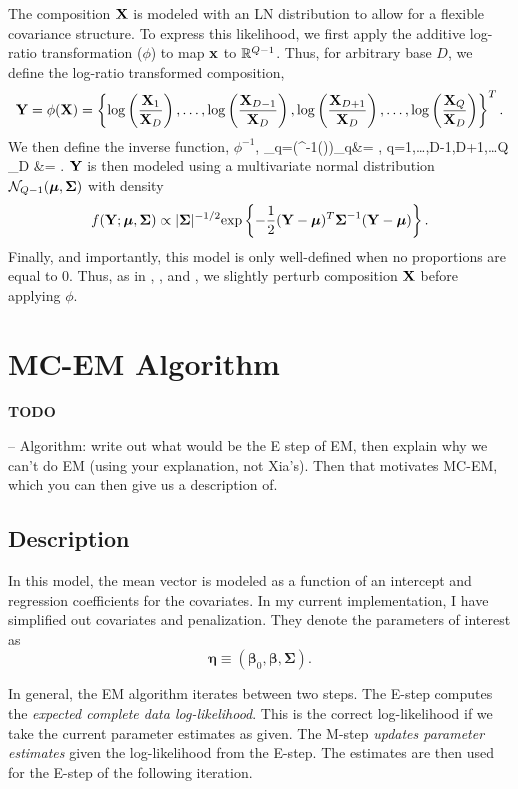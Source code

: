 \documentclass{template}
\begin{document}
The composition $\mathbf{X}$ is modeled with an LN distribution to allow for a flexible covariance structure. To express this likelihood, we first apply the additive log-ratio transformation ($\phi$) to map $\mathbf{x}$ to $\mathbb{R}^{Q-1}$. Thus, for arbitrary base $D$, we define the log-ratio transformed composition,
$$\mathbf{Y}=\phi(\mathbf{X})=\left\{\log\left(\dfrac{\mathbf{X}_1}{\mathbf{X}_D}\right),\ldots,\log\left(\dfrac{\mathbf{X}_{D-1}}{\mathbf{X}_D}\right),\log\left(\dfrac{\mathbf{X}_{D+1}}{\mathbf{X}_D}\right),\ldots,\log\left(\dfrac{\mathbf{X}_Q}{\mathbf{X}_D}\right)\right\}^T.$$
We then define the inverse function, $\phi^{-1}$,
\bal 
{}_q=(\phi^{-1}())_q&= , \quad q=1,\ldots,D-1,D+1,\ldots Q\\
_{D} &= .
\eal 
$\mathbf{Y}$ is then modeled using a multivariate normal distribution $\mathcal{N}_{Q-1}(\boldsymbol{\mu},\boldsymbol{\Sigma})$ with density
$$f(\mathbf{Y}; \boldsymbol{\mu},\boldsymbol{\Sigma}) \propto |\boldsymbol{\Sigma}|^{-1/2} \text{exp}\left\{-\dfrac{1}{2}(\mathbf{Y}-\boldsymbol{\mu})^T\boldsymbol{\Sigma}^{-1}(\mathbf{Y}-\boldsymbol{\mu})\right\}. $$
Finally, and importantly, this model is only well-defined when no proportions are equal to $0$. Thus, as in \cite{aitchison1986statistical}, \cite{billheimer2001statistical}, and \cite{xia2013logistic}, we slightly perturb composition $\mathbf{X}$ before applying $\phi$.


\section{MC-EM Algorithm}

\textbf{TODO}

-- Algorithm: write out what would be the E step of EM, then explain why we can't do EM (using your explanation, not Xia's). Then that motivates MC-EM, which you can then give us a description of.

\subsection{Description}

In this model, the mean vector is modeled as a function of an intercept and  regression coefficients for the covariates. In my current implementation, I have simplified out covariates and penalization. They denote the parameters of interest as $$\boldsymbol{\eta}\equiv (\boldsymbol{\beta}_0,\boldsymbol{\beta},\boldsymbol{\Sigma}).$$

In general, the EM algorithm iterates between two steps. The E-step computes the \textit{expected complete data log-likelihood}. This is the correct log-likelihood if we take the current parameter estimates as given. The M-step \textit{updates parameter estimates} given the log-likelihood from the E-step. The estimates are then used for the E-step of the following iteration.
\end{document}
